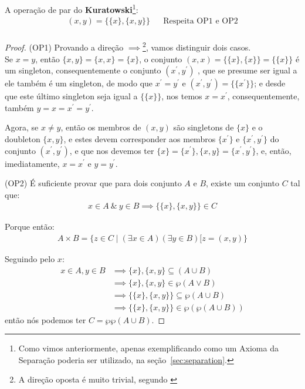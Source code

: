 \documentclass[12pt, a4paper]{article}
\begin{document}
A operação de par do \textbf{Kuratowski}\footnote{Como vimos anteriormente, apenas exemplificando como um Axioma da Separação poderia ser utilizado, na seção~\ref{sec:separation}.}:
\begin{align*}
(x, y) = \{ \{x\}, \{x, y\}\} && \text{Respeita OP1 e OP2}\\
\end{align*}

\begin{proof}
(OP1) Provando a direção $\implies$\footnote{A direção oposta é muito trivial, segundo \cite{moschovakis2006notes}}, vamos distinguir dois casos.\\

Se $x = y$, então $\{x,y\} = \{x, x\} = \{x\}$, o conjunto $(x,x) = \{\{x\},\{x\}\} = \{\{x\}\}$ é um singleton, consequentemente o conjunto $(x^\prime, y^\prime)$ , que se presume ser igual a ele também é um singleton, de modo que $x^\prime = y^\prime$ e $(x^\prime, y^\prime) = \{\{ x^\prime \}\}$; e desde que este último singleton seja igual a $\{\{x\}\}$, nos temos $x = x^\prime$, consequentemente, também $y = x = x^\prime = y^\prime$.

Agora, se $x \neq y$, então os membros de $(x,y)$ são singletons de $\{ x\}$ e o doubleton $\{x,y\}$, e estes devem corresponder aos membros $\{x^\prime \}$ e $\{ x^\prime, y^\prime \}$ do conjunto $(x^\prime, y^\prime)$, e que nos devemos ter $\{x\} = \{x^\prime \}, \{x,y\} = \{x^\prime, y^\prime \}$, e, então, imediatamente, $x = x^\prime$ e $y = y^\prime$.

(OP2) É suficiente provar que para dois conjunto $A$ e $B$, existe um conjunto $C$ tal que:
\begin{align*}
x \in A ~\&~ y \in B \implies \{\{x\}, \{x,y\}\} \in C
\end{align*}

Porque então:
\begin{align*}
A \times B = \{z \in C \mid (\exists x \in A)(\exists y \in B)[z = (x,y)\}
\end{align*}

Seguindo pelo $x$:
\begin{align*}
x \in A, y \in B &\implies \{x\}, \{x,y\} \subseteq  (A \cup B)\\
				&\implies \{x\}, \{x,y\} \in \wp(A \vee B)\\
				&\implies \{\{x\}, \{x,y\}\} \subseteq \wp(A \cup B)\\
				&\implies \{\{x\}, \{x,y\}\} \in \wp (\wp (A \cup B))
\end{align*}
então nós podemos ter $C = \wp \wp (A \cup B)$.
\end{proof}
\end{document}
